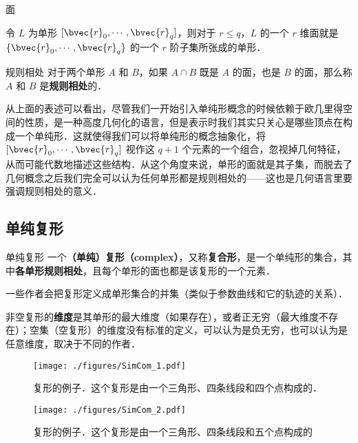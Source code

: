 \begin{definition}{面}

令 $L$ 为单形 $[\bvec{r}_0, \cdots, \bvec{r}_q]$，则对于 $r\leq q$，$L$ 的一个 $r$ 维面就是 $\{\bvec{r}_0, \cdots, \bvec{r}_q\}$ 的一个 $r$ 阶子集所张成的单形．

\end{definition}


\begin{definition}{规则相处}
对于两个单形 $A$ 和 $B$，如果 $A\cap B$ 既是 $A$ 的面，也是 $B$ 的面，那么称 $A$ 和 $B$ 是\textbf{规则相处}的．
\end{definition}


从上面的表述可以看出，尽管我们一开始引入单纯形概念的时候依赖于欧几里得空间的性质，是一种高度几何化的语言，但是表示时我们其实只关心是哪些顶点在构成一个单纯形．这就使得我们可以将单纯形的概念抽象化，将 $[\bvec{r}_0, \cdots, \bvec{r}_q]$ 视作这 $q+1$ 个元素的一个组合，忽视掉几何特征，从而可能代数地描述这些结构．从这个角度来说，单形的面就是其子集，而脱去了几何概念之后我们完全可以认为任何单形都是规则相处的——这也是几何语言里要强调规则相处的意义．

\subsection{单纯复形}

\begin{definition}{单纯复形}
一个\textbf{（单纯）复形（complex）}，又称\textbf{复合形}，是一个单纯形的集合，其中\textbf{各单形规则相处}，且每个单形的面也都是该复形的一个元素．

一些作者会把复形定义成单形集合的并集（类似于参数曲线和它的轨迹的关系）．

非空复形的\textbf{维度}是其单形的最大维度（如果存在），或者正无穷（最大维度不存在）；空集（空复形）的维度没有标准的定义，可以认为是负无穷，也可以认为是任意维度，取决于不同的作者．
\end{definition}

\begin{figure}[ht]
\centering
\texttt{[image: ./figures/SimCom\_1.pdf]}
\caption{复形的例子．这个复形是由一个三角形、四条线段和四个点构成的．} \label{SimCom_fig1}
\end{figure}

\begin{figure}[ht]
\centering
\texttt{[image: ./figures/SimCom\_2.pdf]}
\caption{复形的例子．这个复形是由一个三角形、四条线段和五个点构成的} \label{SimCom_fig2}
\end{figure}


